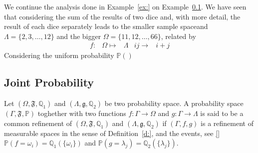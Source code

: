 	\begin{example}
		\label{ex:sum_dice_extension}
		We continue the analysis done in Example~\ref{ex:} on Example~\ref{}. We have seen that  considering the sum of the results of two dice and, with more detail,  the result of each dice separately leads to the smaller sample spaceand $\Lambda = \{ 2,3,\ldots,12\}$ and the bigger  $\Omega = \{11,12,\ldots, 66\}$, related by 
		\begin{equation}
			\begin{array}{ccc}
			f: & \Omega \mapsto &  \Lambda
				& ij\to & i + j 
			\end{array}
		\end{equation}
		Considering the uniform probability $\mathbb P()$
	\end{example}
\subsection{ Joint Probability}
	
	\begin{definition}
		Let $(\Omega, \mathfrak F, \mathbb Q_1)$ and $(\Lambda, \mathfrak g, \mathbb Q_2 )$ be two probability space. A probability space $(\Gamma, \mathfrak F , \mathbb P )$ toghether with two functions $f:\Gamma \to \Omega $ and $g: \Gamma \to \Lambda$ is said to be a common refinement of $(\Omega, \mathfrak F, \mathbb Q_1 )$ and $(\Lambda, \mathfrak g, \mathbb Q_2)$ if $(\Gamma, f, g)$ is a refinement of measurable spaces in the sense of Definition~\ref{d:}, and the events, see \eqref{} $\mathbb P(f = \omega_i) = \mathbb Q_1(\{\omega_i\})$ and $\mathbb P( g  = \lambda_j ) = \mathbb Q_2(\{\lambda_j\})$.
	\end{definition}
	
